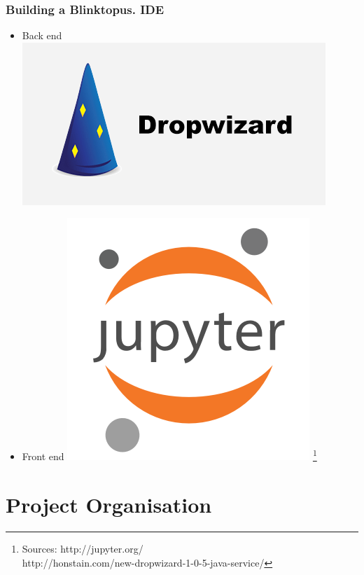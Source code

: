 \documentclass{beamer}
\begin{document}
\begin{frame}
\frametitle{Building a Blinktopus. IDE}
\begin{itemize}
\item{Back end}
\includegraphics[scale=0.3]{img/dropwizard.png}
\vspace{0.25 cm}
\item{Front end}
\includegraphics[scale=0.2]{img/jpnotebook.png}
\footnote{\tiny 
Sources: http://jupyter.org/\\
http://honstain.com/new-dropwizard-1-0-5-java-service/}
\end{itemize}
\end{frame}

\section{Project Organisation}
\end{document}
